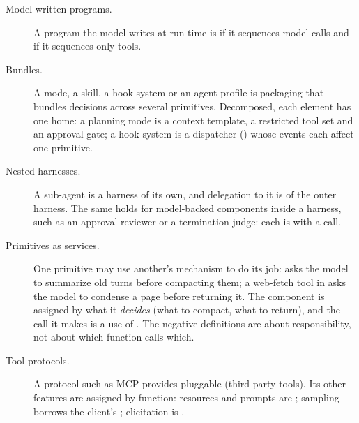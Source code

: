 \begin{description}
  \item[Model-written programs.] A program the model writes at run time is  if it sequences model calls and  if it sequences only tools.
  \item[Bundles.] A mode, a skill, a hook system or an agent profile is packaging that bundles decisions across several primitives. Decomposed, each element has one home: a planning mode is a context template, a restricted tool set and an approval gate; a hook system is a dispatcher () whose events each affect one primitive.
  \item[Nested harnesses.] A sub-agent is a harness of its own, and delegation to it is  of the outer harness. The same holds for model-backed components inside a harness, such as an approval reviewer or a termination judge: each is  with a  call.
  \item[Primitives as services.] One primitive may use another's mechanism to do its job:  asks the model to summarize old turns before compacting them; a web-fetch tool in  asks the model to condense a page before returning it. The component is assigned by what it \emph{decides} (what to compact, what to return), and the call it makes is a use of . The negative definitions are about responsibility, not about which function calls which.
  \item[Tool protocols.] A protocol such as MCP \citep{mcp} provides pluggable  (third-party tools). Its other features are assigned by function: resources and prompts are ; sampling borrows the client's ; elicitation is .
\end{description}

